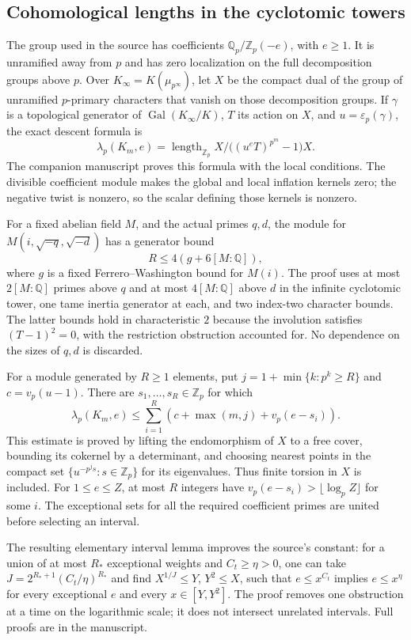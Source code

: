 \documentclass[11pt,a4paper]{article}
\theoremstyle{remark}
\newcommand{\Z}{\mathbb Z}
\newcommand{\Q}{\mathbb Q}
\DeclareMathOperator{\length}{length}
\begin{document}
\subsection{Cohomological lengths in the cyclotomic towers}

The group used in the source has coefficients
$\Q_p/\Z_p(-e)$, with $e\ge1$. It is unramified away from $p$
and has zero localization on the full decomposition groups above
$p$. Over $K_\infty=K(\mu_{p^\infty})$, let $X$ be the compact
dual of the group of unramified $p$-primary characters that vanish
on those decomposition groups. If $\gamma$ is a topological
generator of $\operatorname{Gal}(K_\infty/K)$, $T$ its action on
$X$, and $u=\varepsilon_p(\gamma)$, the exact descent formula is
\[
 \lambda_p(K_m,e)=
 \length_{\Z_p}X/\bigl((u^eT)^{p^m}-1\bigr)X.
\]
The companion manuscript proves this formula with the local
conditions. The divisible coefficient module makes the global and
local inflation kernels zero; the negative twist is nonzero, so
the scalar defining those kernels is nonzero.

For a fixed abelian field $M$, and the actual primes $q,d$, the
module for $M(i,\sqrt{-q},\sqrt{-d})$ has a generator bound
\[
                         R\le4(g+6[M:\Q]),
\]
where $g$ is a fixed Ferrero--Washington bound for $M(i)$.
The proof uses at most $2[M:\Q]$ primes above $q$ and at most
$4[M:\Q]$ above $d$ in the infinite cyclotomic tower, one tame
inertia generator at each, and two index-two character bounds.
The latter bounds hold in characteristic $2$ because the
involution satisfies $(T-1)^2=0$, with the restriction obstruction
accounted for. No dependence on the sizes of $q,d$ is discarded.

For a module generated by $R\ge1$ elements, put
$j=1+\min\{k:p^k\ge R\}$ and $c=v_p(u-1)$.
There are $s_1,\ldots,s_R\in\Z_p$ for which
\[
 \lambda_p(K_m,e)\le
      \sum_{i=1}^R(c+\max(m,j)+v_p(e-s_i)).
\]
This estimate is proved by lifting the endomorphism of $X$ to a
free cover, bounding its cokernel by a determinant, and choosing
nearest points in the compact set
$\{u^{-p^j s}:s\in\Z_p\}$ for its eigenvalues. Thus finite
torsion in $X$ is included. For $1\le e\le Z$, at most $R$
integers have $v_p(e-s_i)>\lfloor\log_p Z\rfloor$ for some $i$.
The exceptional sets for all the required coefficient primes are
united before selecting an interval.

The resulting elementary interval lemma improves the source's
constant: for a union of at most $R_*$ exceptional weights and
$C_t\ge\eta>0$, one can take
$J=2^{R_*+1}(C_t/\eta)^{R_*}$ and find
$X^{1/J}\le Y$, $Y^2\le X$, such that
$e\le x^{C_t}$ implies $e\le x^\eta$ for every exceptional
$e$ and every $x\in[Y,Y^2]$. The proof removes one obstruction
at a time on the logarithmic scale; it does not intersect unrelated
intervals. Full proofs are in the manuscript.
\end{document}
